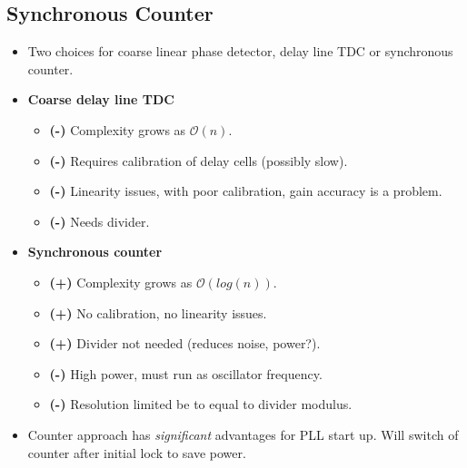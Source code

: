 	\FloatBarrier
	\subsection{Synchronous Counter}
		\begin{itemize}[itemsep=4pt,label=\protect---]
			\item Two choices for coarse linear phase detector, delay line TDC or synchronous counter.

				\item \textbf{Coarse delay line TDC}
				\begin{itemize}
					\item {\color{red}\textbf{(-)}} Complexity grows as $\mathcal{O}(n)$.
					\item {\color{red}\textbf{(-)}} Requires calibration of delay cells (possibly slow).
					\item {\color{red}\textbf{(-)}} Linearity issues, with poor calibration, gain accuracy is a problem.
					\item {\color{red}\textbf{(-)}} Needs divider.
				\end{itemize}

				\item \textbf{Synchronous counter}
				\begin{itemize}
					\item {\color{teal}\textbf{(+)}} Complexity grows as $\mathcal{O}(log(n))$.
					\item {\color{teal}\textbf{(+)}} No calibration, no linearity issues.
					\item {\color{teal}\textbf{(+)}} Divider not needed (reduces noise, power?).
					\item {\color{red}\textbf{(-)}} High power, must run as oscillator frequency.
					\item {\color{red}\textbf{(-)}} Resolution limited be to equal to divider modulus.
				\end{itemize}
			\item Counter approach has \textit{significant} advantages for PLL start up. Will switch of counter after initial lock to save power.
		\end{itemize} 	
